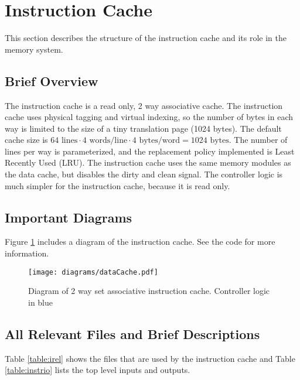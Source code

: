 \section{Instruction Cache}\label{sec:i-cache}
This section describes the structure of the instruction cache and its role in the memory system.

\subsection{Brief Overview}

The instruction cache is a read only, 2 way associative cache. 
The instruction cache uses physical tagging and virtual indexing, so the number of bytes in each way is limited to the size of a tiny translation page (1024 bytes). 
The default cache size is $64 \text{ lines} \cdot 4 \text{ words/line} \cdot 4 \text{ bytes/word} = 1024 \text{ bytes}$. 
The number of lines per way is parameterized, and the replacement policy implemented is Least Recently Used (LRU).
The instruction cache uses the same memory modules as the data cache, but disables the dirty and clean signal.
The controller logic is much simpler for the instruction cache, because it is read only.

\subsection{Important Diagrams}

	Figure \ref{fig:icachediag} includes a diagram of the instruction cache.
	See the code for more information.
	\begin{figure}
	\label{fig:icachediag}
	\centering
	\texttt{[image: diagrams/dataCache.pdf]}
	\caption{Diagram of 2 way set associative instruction cache. Controller logic in blue}
	\end{figure}

\subsection{All Relevant Files and Brief Descriptions}

	Table \ref{table:irel} shows the files that are used by the instruction cache and Table \ref{table:instrio} lists the top level inputs and outputs.

